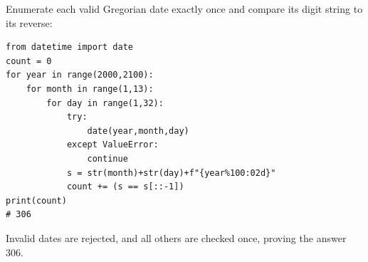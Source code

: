 Enumerate each valid Gregorian date exactly once and compare its digit string to its reverse:
\begin{verbatim}
from datetime import date
count = 0
for year in range(2000,2100):
    for month in range(1,13):
        for day in range(1,32):
            try:
                date(year,month,day)
            except ValueError:
                continue
            s = str(month)+str(day)+f"{year%100:02d}"
            count += (s == s[::-1])
print(count)
# 306
\end{verbatim}
Invalid dates are rejected, and all others are checked once, proving the answer $\boxed{306}$.
